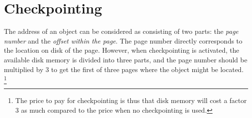 \chapter{Checkpointing}
\label{chap-checkpointing}

The address of an object can be considered as consisting of two parts:
the \emph{page number} and the \emph{offset within the page}.  The
page number directly corresponds to the location on disk of the page.
However, when checkpointing is activated, the available disk memory is
divided into three parts, and the page number should be multiplied by
3 to get the first of three pages where the object might be located.%
\footnote{The price to pay for checkpointing is thus that disk memory
  will cost a factor 3 as much compared to the price when no
  checkpointing is used.}



